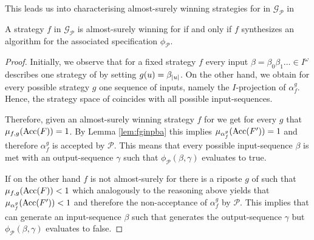 This leads us into characterising almost-surely winning strategies for \eve{}
in $\mathcal{G}_{\mathcal{P}}$ in
\begin{lemma}
  A strategy $f$ in $\mathcal{G}_{\mathcal{P}}$ is almost-surely winning for
  \eve{} if and only if $f$ synthesizes an algorithm for the associated 
  specification $\phi_{\mathcal{P}}$.
\end{lemma}
\begin{proof}
  Initially, we observe that for a fixed strategy $f$ every input
  $\beta = \beta_{0}\beta_{1}\dots\in I^{\omega}$ describes one strategy of 
  \adam{} by setting $g(u) = \beta_{\left\vert{u}\right\vert}$. On the other hand, we obtain
  for every possible strategy $g$ one sequence of inputs, namely the 
  $I$-projection of $\alpha_{f}^{g}$. Hence, the strategy space of \adam{}
  coincides with all possible input-sequences. 

  Therefore, given an almost-surely winning strategy $f$ for \eve{} we get 
  for every $g$ that $\mu_{f,g}(\operatorname{Acc}(F)) = 1$. By Lemma \ref{lem:fginpba} 
  this implies $\mu_{\alpha_{f}^{g}}(\operatorname{Acc}(F')) = 1$ and therefore 
  $\alpha_{f}^{g}$ is accepted by $\mathcal{P}$. This means that every 
  possible input-sequence $\beta$ is met with an output-sequence $\gamma$ 
  such that $\phi_{\mathcal{P}}(\beta, \gamma)$ evaluates to true.

  If on the other hand $f$ is not almost-surely for \eve{} there is a riposte 
  $g$ of \adam{} such that $\mu_{f,g}(\operatorname{Acc}(F)) < 1$ which analogously to the 
  reasoning above yields that $\mu_{\alpha_{f}^{g}}(\operatorname{Acc}(F')) < 1$ and 
  therefore the non-acceptance of $\alpha_{f}^{g}$ by $\mathcal{P}$. 
  This implies that \adam{} can generate an input-sequence $\beta$ such that 
  \eve{} generates the output-sequence $\gamma$ but 
  $\phi_{\mathcal{P}}(\beta, \gamma)$ evaluates to false.
\end{proof}

